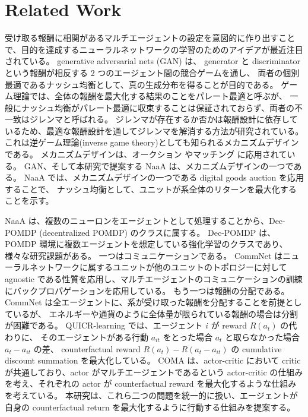 \section{Related Work}

受け取る報酬に相関があるマルチエージェントの設定を意図的に作り出すことで、目的を達成するニューラルネットワークの学習のためのアイデアが最近注目されている。
generative adversarial nets (GAN) \citep{goodfellow2014generative} は、
generator と discriminator という報酬が相反する 2 つのエージェント間の競合ゲームを通し、
両者の個別最適であるナッシュ均衡として、真の生成分布を得ることが目的である。 %
ゲーム理論では、全体の報酬を最大化する結果のことをパレート最適と呼ぶが、
一般にナッシュ均衡がパレート最適に収束することは保証されておらず、両者の不一致はジレンマと呼ばれる。
ジレンマが存在するか否かは報酬設計に依存しているため、最適な報酬設計を通してジレンマを解消する方法が研究されている。
これは逆ゲーム理論(inverse game theory)としても知られるメカニズムデザイン\citep{myerson1983mechanism}である。
メカニズムデザインは、オークション \citep{vickrey1961counterspeculation} やマッチング \citep{gale1962college} に応用されている。
GAN、そして本研究で提案する NaaA は、メカニズムデザインの一つである。
NaaA では、メカニズムデザインの一つである digital goods auction \citep{guruswami2005profit} を応用することで、
ナッシュ均衡として、ユニットが系全体のリターンを最大化することを示す。

NaaA は、複数のニューロンをエージェントとして処理することから、Dec-POMDP (decentralized POMDP) のクラスに属する。
Dec-POMDP は、POMDP 環境に複数エージェントを想定している強化学習のクラスであり、様々な研究課題がある。
一つはコミュニケーションである。
CommNet \citep{sukhbaatar2016learning} はニューラルネットワークに属するユニットが他のユニットのトポロジーに対して agnostic である性質を応用し、マルチエージェントのコミュニケーションの訓練にバックプロパゲーションを応用している。
もう一つは報酬の分配である。CommNet は全エージェントに、系が受け取った報酬を分配することを前提としているが、
エネルギーや通貨のように全体量が限られている報酬の場合は分割が困難である。
QUICR-learning \citep{agogino2006quicr} では、エージェント $i$ が reward $R(a_t)$ の代わりに、
そのエージェントがある行動 $a_{it}$ をとった場合 $a_t$ と取らなかった場合 $a_t-a_{it}$ の差、
counterfactual reward $R(a_t) - R(a_t - a_{it})$ の cumulative discount summation を最大化している。
COMA \citep{foerster2017counterfactual} は、actor-critic において critic が共通しており、actor がマルチエージェントであるという actor-critic の仕組みを考え、それぞれの actor が counterfactual reward を最大化するような仕組みを考えている。
本研究は、これら二つの問題を統一的に扱い、エージェントが自身の counterfactual return を最大化するように行動する仕組みを提案する。

